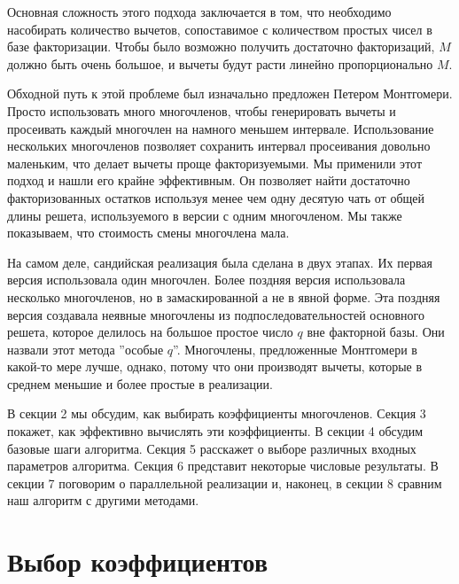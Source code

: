 \documentclass[a4paper,12pt]{report}
\begin{document}
Основная сложность этого подхода заключается в том, что необходимо насобирать количество вычетов, сопоставимое с количеством простых чисел в базе факторизации. Чтобы было возможно получить достаточно факторизаций, $M$ должно быть очень большое, и вычеты будут расти линейно пропорционально $M$. 

Обходной путь к этой проблеме был изначально предложен Петером Монтгомери. Просто использовать много многочленов, чтобы генерировать вычеты и просеивать каждый многочлен на намного меньшем интервале. Использование нескольких многочленов позволяет сохранить интервал просеивания довольно маленьким, что делает вычеты проще факторизуемыми. Мы применили этот подход и нашли его крайне эффективным. Он позволяет найти достаточно факторизованных остатков используя менее чем одну десятую чать от общей длины решета, используемого в версии с одним многочленом. Мы также показываем, что стоимость смены многочлена мала.

На самом деле, сандийская реализация была сделана в двух этапах. Их первая версия использовала один многочлен. Более поздняя версия использовала несколько многочленов, но в замаскированной а не в явной форме. Эта поздняя версия создавала неявные многочлены из подпоследовательностей основного решета, которое делилось на большое простое число $q$ вне факторной базы. Они назвали этот метода ''особые $q$''. Многочлены, предложенные Монтгомери в какой-то мере лучше, однако, потому что они производят вычеты, которые в среднем меньшие и более простые в реализации.

В секции 2 мы обсудим, как выбирать коэффициенты многочленов. Секция 3 покажет, как эффективно вычислять эти коэффициенты. В секции 4 обсудим базовые шаги алгоритма. Секция 5 расскажет о выборе различных входных параметров алгоритма. Секция 6 представит некоторые числовые результаты. В секции 7 поговорим о параллельной реализации и, наконец, в секции 8 сравним наш алгоритм с другими методами.

\section{Выбор коэффициентов}
\end{document}

